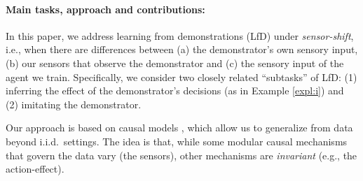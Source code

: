 \documentclass[letterpaper]{article} %
\theoremstyle{definition}%
\theoremstyle{definition}
\begin{document}
\paragraph{Main tasks, approach and contributions:}
In this paper, we address learning from demonstrations (LfD) under \emph{sensor-shift}, i.e., when %
there are differences between (a)  the demonstrator's own sensory input, (b) our sensors that observe the demonstrator and (c) the sensory input of the agent we train. 
Specifically, we consider two closely related ``subtasks'' of LfD: (1) inferring the effect of the demonstrator's decisions (as in Example \ref{expl:i}) and (2) imitating the demonstrator.
%

Our approach is based on causal models \cite{pearl2009causality,spirtes2000causation,peters2017elements}, which allow us to generalize from data beyond i.i.d.\ settings.
The idea is that, while some modular causal mechanisms that govern the data vary (the sensors), other mechanisms are \emph{invariant} (e.g., the action-effect). %
\end{document}
